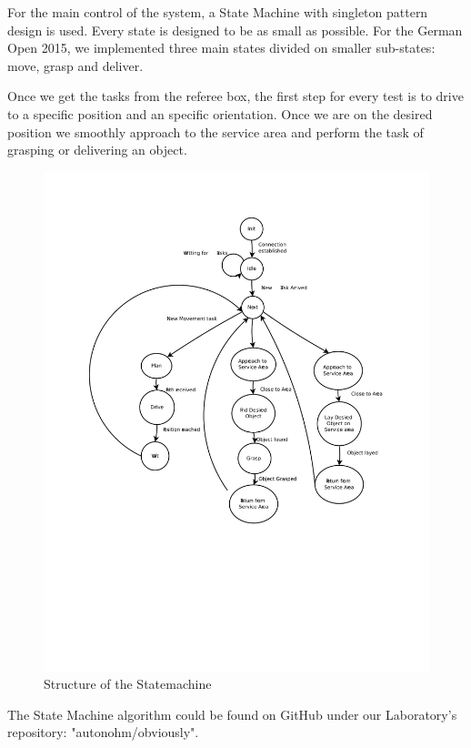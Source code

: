 For the main control of the system, a State Machine with singleton pattern design is used. Every state is designed to be as small as possible. For the German Open 2015, we implemented three main states divided on smaller sub-states: move, grasp and deliver.

Once we get the tasks from the referee box, the first step for every test is to drive to a specific position and an specific orientation. Once we are on the desired position we smoothly approach to the service area and perform the task of grasping or delivering an object. 	


\begin{figure}[htbp]
	\centering
	\includegraphics[width=\textwidth]{img/SM}
	\caption{Structure of the Statemachine}
	\label{fig:SM}
\end{figure}


The State Machine algorithm could be found on GitHub under our Laboratory's repository: "autonohm/obviously". 